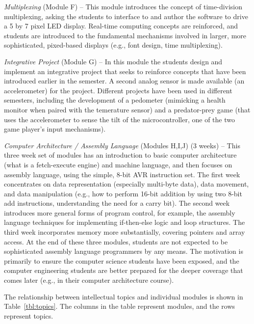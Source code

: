 \emph{Multiplexing} (Module F) -- 
This module introduces the concept of time-division multiplexing, asking the
students to interface to and author the software to drive a 5 by 7 pixel
LED display. Real-time computing concepts are reinforced, and students
are introduced to the fundamental mechanisms involved in larger, more
sophisticated, pixed-based displays (e.g., font design, time multiplexing).

\emph{Integrative Project} (Module G) --
In this module the students design and implement an integrative project
that seeks to reinforce concepts that have been introduced earlier in the
semester.  A second analog sensor is made available (an accelerometer)
for the project.
Different projects have been used in different semesters, including
the development of a pedometer (mimicking a health monitor when paired
with the temerature sensor) and a predator-prey game (that uses the
accelerometer to sense the tilt of the microcontroller, one of the two
game player's input mechanisms).

\emph{Computer Architecture / Assembly Language} (Modules H,I,J) (3 weeks) -- 
This three week set of modules has an introduction to basic computer
architecture (what is a fetch-execute engine) and machine language, and then
focuses on assembly language, using the simple, 8-bit AVR instruction set.
The first week concentrates on data representation (especially multi-byte
data), data movement, and data manipulation
(e.g., how to perform 16-bit addition by using two 8-bit add instructions,
understanding the need for a carry bit).
The second week introduces more general forms of program control, for example,
the assembly language techniques for implementing if-then-else logic
and loop structures.
The third week incorporates memory more substantially, covering pointers
and array access.
At the end of these three modules, students are not expected to be
sophisticated assembly language programmers by any means.  The motivation
is primarily to ensure the computer science students have been exposed,
and the computer engineering students are better prepared for the deeper
coverage that comes later (e.g., in their computer architecture course).

The relationship between intellectual topics and individual modules is
shown in Table~\ref{tbl:topics}. The columns in the table represent
modules, and the rows represent topics.

